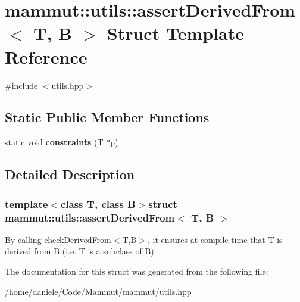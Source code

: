 \hypertarget{structmammut_1_1utils_1_1assertDerivedFrom}{\section{mammut\-:\-:utils\-:\-:assert\-Derived\-From$<$ T, B $>$ Struct Template Reference}
\label{structmammut_1_1utils_1_1assertDerivedFrom}
}


{\ttfamily \#include $<$utils.\-hpp$>$}

\subsection*{Static Public Member Functions}
\begin{DoxyCompactItemize}
\item 
\hypertarget{structmammut_1_1utils_1_1assertDerivedFrom_adacae6374bedf3083d250b741ed10e93}{static void {\bfseries constraints} (T $\ast$p)}\label{structmammut_1_1utils_1_1assertDerivedFrom_adacae6374bedf3083d250b741ed10e93}

\end{DoxyCompactItemize}


\subsection{Detailed Description}
\subsubsection*{template$<$class T, class B$>$struct mammut\-::utils\-::assert\-Derived\-From$<$ T, B $>$}

By calling check\-Derived\-From$<$\-T,\-B$>$, it ensures at compile time that T is derived from B (i.\-e. T is a subclass of B). 

The documentation for this struct was generated from the following file\-:\begin{DoxyCompactItemize}
\item 
/home/daniele/\-Code/\-Mammut/mammut/utils.\-hpp\end{DoxyCompactItemize}

